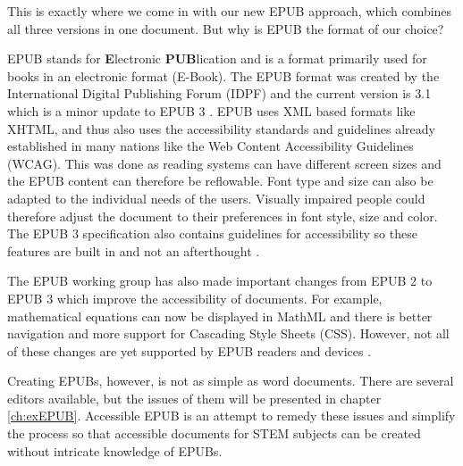 \documentclass[runningheads,a4paper]{llncs}
\begin{document}
This is exactly where we come in with our new EPUB approach, which combines all three versions in one document. But why is EPUB the format of our choice?

EPUB stands for {\bf E}lectronic {\bf PUB}lication and is a format primarily used for books in an electronic format (E-Book). The EPUB format was created by the International Digital Publishing Forum (IDPF) and the current version is 3.1 which is a minor update to EPUB 3 \cite{EPUBspecs}. EPUB uses XML based formats like XHTML, and thus also uses the accessibility standards and guidelines already established in many nations like the Web Content Accessibility Guidelines (WCAG)\cite{WCAG}. This was done as reading systems can have different screen sizes and the EPUB content can therefore be reflowable. Font type and size can also be adapted to the individual needs of the users. Visually impaired people could therefore adjust the document to their preferences in font style, size and color. The EPUB 3 specification also contains guidelines for accessibility so these features are built in and not an afterthought \cite{EPUB3bp}.

The EPUB working group has also made important changes from EPUB 2 to EPUB 3 which improve the accessibility of documents. For example, mathematical equations can now be displayed in MathML and there is better navigation and more support for Cascading Style Sheets (CSS). However, not all of these changes are yet supported by EPUB readers and devices \cite{EPUB30changes}. 

Creating EPUBs, however, is not as simple as word documents. There are several editors available, but the issues of them will be presented in chapter \ref{ch:exEPUB}. Accessible EPUB is an attempt to remedy these issues and simplify the process so that accessible documents for STEM subjects can be created without intricate knowledge of EPUBs.
\end{document}
